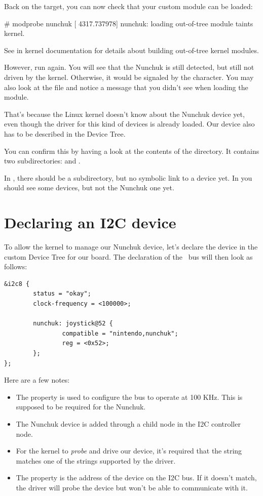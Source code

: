 {Back on the target, you can now check that your custom module can
be loaded:

\begin{bashinput}
# modprobe nunchuk
[ 4317.737978] nunchuk: loading out-of-tree module taints kernel.
\end{bashinput}

See  in kernel documentation
for details about building out-of-tree kernel modules.

However, run  again. You will see that the
Nunchuk is still detected, but still not driven by the kernel.
Otherwise, it would be signaled by the  character. You
may also look at the  file and notice a
 message that you didn't
see when loading the module.

That's because the Linux kernel doesn't know about the Nunchuk
device yet, even though the driver for this kind of devices is
already loaded. Our device also has to be described in the Device Tree.

You can confirm this by having a look at the contents of the
 directory.  It contains two subdirectories:
 and .

In , there should be a  subdirectory,
but no symbolic link to a device yet. In  you should
see some devices, but not the Nunchuk one yet.

\section{Declaring an I2C device}

To allow the kernel to manage our Nunchuk device, let's declare the
device in the custom Device Tree for our board. The declaration of the \busname\ 
bus will then look as follows:

\begin{verbatim}
&i2c8 {
        status = "okay";
        clock-frequency = <100000>;

        nunchuk: joystick@52 {
                compatible = "nintendo,nunchuk";
                reg = <0x52>;
        };
};
\end{verbatim}

Here are a few notes:
\begin{itemize}
\item The  property is used to configure the bus
      to operate at 100 KHz. This is supposed to be required for the
      Nunchuk.
\item The Nunchuk device is added through a child node in the I2C
      controller node.
\item For the kernel to {\em probe} and drive our device, it's required
      that the  string matches one of the
      \code{compatible} strings supported by the driver.
\item The  property is the address of the device on the
      I2C bus. If it doesn't match, the driver will probe the device
      but won't be able to communicate with it.
\end{itemize}

}
